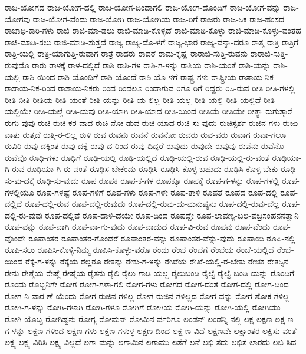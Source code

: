 {ರಾಜ-ಯೋಗದ
ರಾಜ-ಯೋಗ-ದಲ್ಲಿ
ರಾಜ-ಯೋಗ-ದಿಂದಾಗಲಿ
ರಾಜ-ಯೋಗ-ದೊಂದಿಗೆ
ರಾಜ-ಯೋಗ-ವನ್ನು
ರಾಜ-ಯೋಗವು
ರಾಜ-ಯೋಗ-ವೆಂದು
ರಾಜ-ಯೋಗಿ
ರಾಜ-ಯೋಗಿಯ
ರಾಜ-ರಿಗೆ
ರಾಜರು
ರಾಜ-ಸಿಕ
ರಾಜ-ಹಂಸದ
ರಾಜಾಧಿ-ಕಾರಿ-ಗಳು
ರಾಜಿ
ರಾಜಿ-ಮಾ-ಡಲು
ರಾಜಿ-ಮಾಡಿ-ಕೊಳ್ಳದೆ
ರಾಜಿ-ಮಾಡಿ-ಕೊಳ್ಳು
ರಾಜಿ-ಮಾಡಿ-ಕೊಳ್ಳು-ವಂತಹ
ರಾಜಿ-ಮಾಡಿ-ಸಲು
ರಾಜಿ-ಮಾಡಿ-ಸುತ್ತದೆ
ರಾಜ್ಯ
ರಾಜ್ಯ-ದೊ-ಳಗೆ
ರಾಜ್ಯ-ಭಾರ
ರಾಜ್ಯ-ವನ್ನಾ-ದರೂ
ರಾತ್ಮ
ರಾತ್ರಿ
ರಾತ್ರಿಗೆ
ರಾತ್ರಿ-ಯಲ್ಲಿ
ರಾತ್ರಿ-ಯಾಗುತ್ತಿ-ರುವಾಗ
ರಾತ್ರೆ
ರಾದರು
ರಾದರೆ
ರಾಮ-ಕೃಷ್ಣ
ರಾರಾಜಿ-ಸುತ್ತಿ-ರುವನು
ರಾರಾಜಿ-ಸುತ್ತಿ-ರುವುದೊ
ರಾರು
ರಾಳಕ್ಕೆ
ರಾಳ-ದಲ್ಲಿದೆ
ರಾಶಿ
ರಾಶಿ-ಗಳ
ರಾಶಿ-ಗ-ಳನ್ನು
ರಾಶಿಯ
ರಾಶಿ-ಯಂತೆ
ರಾಶಿ-ಯನ್ನು
ರಾಶಿ-ಯಲ್ಲಿ
ರಾಶಿ-ಯಿಂದ
ರಾಶಿ-ಯೊಂದಿಗೆ
ರಾಶಿ-ಯೊಂದೆ
ರಾಶಿ-ಯೊ-ಳಗೆ
ರಾಷ್ಟ್ರ-ಗಳು
ರಾಷ್ಟ್ರೀಯ
ರಾಸಾಯ-ನಿಕ
ರಾಸಾಯ-ನಿಕ-ರಿಂದ
ರಾಸಾಯ-ನಿಕರು
ರಿಂದ
ರಿಂದಲೂ
ರಿಂದಾಗುವ
ರಿಗೂ
ರಿಗೆ
ರಿದ್ದರು
ರಿಸಿ-ರುವ
ರೀತಿ
ರೀತಿ-ಗಳಲ್ಲಿ
ರೀತಿ-ನೀತಿ
ರೀತಿಯ
ರೀತಿ-ಯಂತೆ
ರೀತಿ-ಯನ್ನು
ರೀತಿ-ಯ-ಲಿಲ್ಲ
ರೀತಿ-ಯಲ್ಲ
ರೀತಿ-ಯಲ್ಲಿ
ರೀತಿ-ಯಲ್ಲಿದೆ
ರೀತಿ-ಯಲ್ಲಿಯೇ
ರೀತಿ-ಯಲ್ಲೆ
ರೀತಿ-ಯವು
ರೀತಿ-ಯಾಗಿ
ರೀತಿ-ಯಾದ
ರೀತಿ-ಯಿಂದ
ರೀತಿಯೆ
ರೀತಿಯೇ
ರೀತ್ಯಾ
ರುಗುತ್ತಾರೆ
ರುಗು-ವುವು
ರುಚಿ
ರುಚಿ-ಕರ-ವಾದ
ರುಚಿ-ನೋ-ಡುವ
ರುಚಿ-ಯಾದ
ರುಚಿ-ಸು-ವುದು
ರುಚಿಸ್ಪರ್ಶ
ರುಜಿನ-ಗಳು
ರುಜು-ವಾತು
ರುತ್ತದೆ
ರುತ್ತಿ-ರ-ಲಿಲ್ಲ
ರುಳಿ
ರುವ
ರುವನು
ರುವನೆ
ರುವನೋ
ರುವರು
ರುವ-ವರು
ರುವಾಗ
ರುವಾ-ಗಲೂ
ರುವಿರಿ
ರುವು-ದಕ್ಕಿಂತ
ರುವು-ದಕ್ಕೆ
ರುವು-ದ-ರಿಂದ
ರುವು-ದಿದ್ದರೆ
ರುವುದು
ರುವುದೇ
ರುವುವು
ರುವೆನು
ರುವೆನೊ
ರುವೆವೊ
ರೂಢಿ-ಗಳು
ರೂಢಿಗೆ
ರೂಢಿ-ಯಲ್ಲಿ
ರೂಢಿ-ಯಲ್ಲಿದೆ
ರೂಢಿ-ಯಲ್ಲಿ-ರುವ
ರೂಢಿ-ಯಲ್ಲಿ-ರು-ವಂತೆ
ರೂಢಿಯಾ-ಗಿ-ರುವ
ರೂಢಿಯಾ-ಗಿ-ರು-ವಂತೆ
ರೂಢಿಸ-ಬೇಕೆಂದು
ರೂಢಿಸಿ
ರೂಢಿಸಿ-ಕೊಳ್ಳ-ಬಹುದು
ರೂಢಿಸಿ-ಕೊಳ್ಳ-ಬೇಕು
ರೂಢಿ-ಸು-ವು-ದಕ್ಕೆ
ರೂಢಿ-ಸು-ವುದು
ರೂಪ
ರೂಪಕ
ರೂಪ-ಕ-ಗಳ
ರೂಪಕ್ಕೂ
ರೂಪಕ್ಕೆ
ರೂಪ-ಗ-ಳನ್ನು
ರೂಪ-ಗಳಲ್ಲಿ
ರೂಪ-ಗಳಲ್ಲಿಯೂ
ರೂಪ-ಗಳಷ್ಟೆ
ರೂಪ-ಗಳಿಗೆ
ರೂಪ-ಗಳು
ರೂಪ-ಗಳೇ
ರೂಪ-ತಾಳಿ
ರೂಪತೆ
ರೂಪದ
ರೂಪ-ದಲ್ಲಿ
ರೂಪ-ದಲ್ಲಿದೆ
ರೂಪ-ದಲ್ಲಿ-ರುವ
ರೂಪ-ದಲ್ಲಿ-ರುವುದು
ರೂಪ-ದಲ್ಲಿ-ರುವು-ದು-ಮನುಷ್ಯನು
ರೂಪ-ದಲ್ಲಿ-ರುವು-ದೆಲ್ಲ
ರೂಪ-ದಲ್ಲಿ-ರು-ವುವು
ರೂಪ-ದಲ್ಲಿವೆ
ರೂಪ-ದಾಳಿ-ದೆಯೇ
ರೂಪ-ದಿಂದ
ರೂಪದ್ದೇ
ರೂಪ-ಲಾವಣ್ಯ-ಬಲ-ವಜ್ರಸಂಹನನತ್ವಾನಿ
ರೂಪ-ವನ್ನು
ರೂಪ-ವಾಗಿ
ರೂಪ-ವಾ-ಗು-ವುದು
ರೂಪ-ವಾದುದೆ
ರೂಪ-ವಿ-ರುವ
ರೂಪವು
ರೂಪ-ವೆಂದು
ರೂಪ-ವೊಂದೇ
ರೂಪಾಂತರ
ರೂಪಾಂತರ-ಗೊಂಡರೆ
ರೂಪಾಂತರ-ವನ್ನು
ರೂಪಾಂತರ-ವೆನ್ನು-ವುದು
ರೂಪಾಯಿ
ರೂಪಿ-ನಲ್ಲಿ
ರೂಪಿ-ಸಲು
ರೂಪಿಸಿ-ಕೊಳ್ಳಿ-ನಿಮ್ಮ
ರೂಪಿಸಿ-ಕೊಳ್ಳು-ವರೊ
ರೆಂದು
ರೆಂಬೆ
ರೆಂಬೆಗೆ
ರೆಂಬೆಯ
ರೆಂಬೆ-ಯಲ್ಲಿದೆ
ರೆಂಬೆ-ಯಿಂದ
ರೆಕ್ಕೆ-ಗ-ಳನ್ನು
ರೆಕ್ಕೆಯ
ರೆಲ್ಲರೂ
ರೇಕನ್ನು
ರೇಕು-ಗ-ಳನ್ನು
ರೇಖೆಯ
ರೇಖೆ-ಯಲ್ಲಿ-ರ-ಬೇಕು
ರೇಚಕ
ರೇತಸ್ಸಿನ
ರೇನು
ರೇಶ್ಮೆಯ
ರೇಷ್ಮೆ
ರೇಷ್ಮೆಯ
ರೈತನು
ರೈಲಿ
ರೈಲು-ಗಾಡಿ-ಯಲ್ಲ
ರೈಲುಬಂಡಿ
ರೈಲ್ವೆ
ರೈಲ್ವೆ-ಬಂಡಿ-ಯನ್ನು
ರೊಂದಿಗೆ
ರೊಂದು
ರೊಬ್ಬನಿಗೇ
ರೋಗ
ರೋಗ-ಗಳಾ-ಗಲಿ
ರೋಗ-ಗಳು
ರೋಗದ
ರೋಗ-ದಂತೆ
ರೋಗ-ದಲ್ಲಿ
ರೋಗ-ದಿಂದ
ರೋಗ-ನಿ-ವಾರ-ಣೆ-ಯೆಂದು
ರೋಗ-ರುಜಿನ-ಗಳಿಲ್ಲ
ರೋಗ-ರುಜಿನ-ಗಳಿಲ್ಲದ
ರೋಗ-ವನ್ನು
ರೋಗ-ಶೋಕ-ಗಳಿಲ್ಲ
ರೋಗಿ-ಗ-ಳನ್ನು
ರೋಗಿ-ಗಳಾಗಿ
ರೋಗಿ-ಗಳೂ
ರೋಗಿಗೆ
ರೋಗಿಯ
ರೋಗಿ-ಯನ್ನು
ರೋಗಿ-ಯಲ್ಲಿ
ರೋಗಿಯು
ರೋಗಿ-ಯೊಬ್ಬ
ರೋಗಿಷ್ಟನು
ರೋಗ್ಯ
ರೋಮನ್
ರೋಮಿನ
ರ್ವರಿಗೂ
ಲಂಡನ್
ಲಂಡನ್ನಿ-ನಲ್ಲಿ
ಲಕ್ಷ
ಲಕ್ಷಣ
ಲಕ್ಷ-ಣ-ಗ-ಳನ್ನು
ಲಕ್ಷಣ-ಗಳಿಂದ
ಲಕ್ಷಣ-ಗಳು
ಲಕ್ಷಣ-ಗಳುಳ್ಳ
ಲಕ್ಷಣ-ದಿಂದ
ಲಕ್ಷ-ಣ-ವಿದೆ
ಲಕ್ಷಣವೇ
ಲಕ್ಷಾಂತರ
ಲಕ್ಷಿಸು-ವಂತೆ
ಲಕ್ಷ್ಯ
ಲಕ್ಷ್ಯ-ವಿರಿಸಿ
ಲಕ್ಷ್ಯ-ವಿಲ್ಲದೆ
ಲಗಾ-ಮನ್ನು
ಲಗಾಮಿನ
ಲಗಾಮು
ಲತೆಗೆ
ಲನೆ
ಲಭಿ-ಸದು
ಲಭಿಸ-ಲಾರದು
ಲಭಿ-ಸಿದ
}
